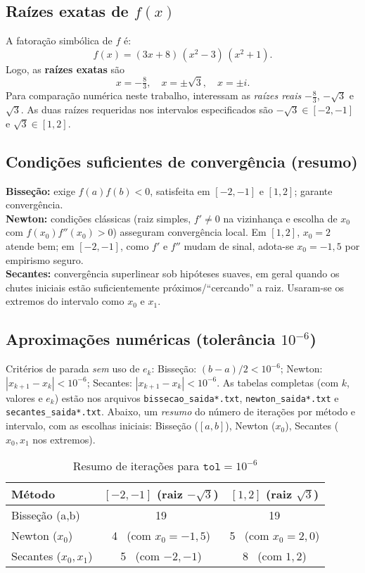 \documentclass[12pt,a4paper]{article}
\begin{document}
\subsection{Raízes exatas de $f(x)$}
A fatoração simbólica de $f$ é:
\[
f(x)=(3x+8)\,(x^{2}-3)\,(x^{2}+1).
\]
Logo, as \textbf{raízes exatas} são
\[
x=-\tfrac{8}{3},\quad x=\pm \sqrt{3},\quad x=\pm i.
\]
Para comparação numérica neste trabalho, interessam as \emph{raízes reais} $-\tfrac{8}{3}$, $-\sqrt{3}$ e $\sqrt{3}$.
As duas raízes requeridas nos intervalos especificados são $-\sqrt{3}\in[-2,-1]$ e $\sqrt{3}\in[1,2]$.

\subsection{Condições suficientes de convergência (resumo)}
\textbf{Bisseção:} exige $f(a)f(b)<0$, satisfeita em $[-2,-1]$ e $[1,2]$; garante convergência.
\\
\textbf{Newton:} condições clássicas (raiz simples, $f'\neq 0$ na vizinhança e escolha de $x_0$ com $f(x_0)f''(x_0)>0$) asseguram convergência local. Em $[1,2]$, $x_0=2$ atende bem; em $[-2,-1]$, como $f'$ e $f''$ mudam de sinal, adota-se $x_0=-1{,}5$ por empirismo seguro.
\\
\textbf{Secantes:} convergência superlinear sob hipóteses suaves, em geral quando os chutes iniciais estão suficientemente próximos/“cercando” a raiz. Usaram-se os extremos do intervalo como $x_0$ e $x_1$.

\subsection{Aproximações numéricas (tolerância $10^{-6}$)}
Critérios de parada \emph{sem} uso de $e_k$:
Bisseção: $(b-a)/2<10^{-6}$; Newton: $|x_{k+1}-x_k|<10^{-6}$; Secantes: $|x_{k+1}-x_k|<10^{-6}$.
As tabelas completas (com $k$, valores e $e_k$) estão nos arquivos \texttt{bissecao\_saida*.txt}, \texttt{newton\_saida*.txt} e
\texttt{secantes\_saida*.txt}. Abaixo, um \emph{resumo} do número de iterações por método e intervalo, com as escolhas iniciais:
Bisseção ($[a,b]$), Newton ($x_0$), Secantes ($x_0,x_1$ nos extremos).

\begin{table}[H]
\centering
\caption{Resumo de iterações para $\texttt{tol}=10^{-6}$}
\label{tab:resumo}
\begin{tabular}{lcc}
\toprule
Método & $[-2,-1]$ (raiz $-\sqrt{3}$) & $[1,2]$ (raiz $\sqrt{3}$) \\
\midrule
Bisseção (a,b) & 19 & 19 \\
Newton ($x_0$) & 4 \, (com $x_0=-1{,}5$) & 5 \, (com $x_0=2{,}0$) \\
Secantes ($x_0,x_1$) & 5 \, (com $-2,-1$) & 8 \, (com $1,2$) \\
\bottomrule
\end{tabular}
\end{table}
\end{document}
